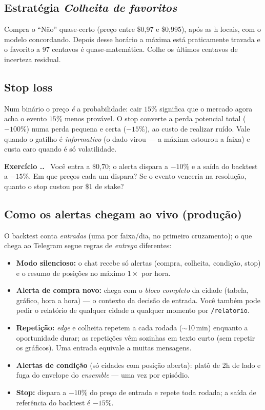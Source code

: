 \documentclass[11pt,a4paper]{article}
\newcounter{exc}[section]
\renewcommand{\theexc}{\thesection.\arabic{exc}}
\newenvironment{exercicio}{\refstepcounter{exc}\medskip\noindent
  \textbf{\color{azul}Exercício \theexc.}\ }{\medskip}
\begin{document}
\subsection{Estratégia \emph{Colheita de favoritos}}
Compra o ``Não'' quase-certo (preço entre \$0,97 e \$0,995), após as
\harvActiveHour{}h locais, com o modelo concordando. Depois desse horário a
máxima está praticamente travada e o favorito a 97 centavos é quase-matemática.
Colhe os últimos centavos de incerteza residual.

\subsection{Stop loss}
Num binário o preço \emph{é} a probabilidade: cair $15\%$ significa que o
mercado agora acha o evento $15\%$ menos provável. O stop converte a perda
potencial total ($-100\%$) numa perda pequena e certa ($-15\%$), ao custo de
realizar ruído. Vale quando o gatilho é \emph{informativo} (o dado virou --- a
máxima estourou a faixa) e custa caro quando é só volatilidade.

\begin{exercicio}
Você entra a \$0,70; o alerta dispara a $-10\%$ e a saída do backtest a
$-15\%$. Em que preços cada um dispara? Se o evento venceria na resolução,
quanto o stop custou por \$1 de stake?
\end{exercicio}

\subsection{Como os alertas chegam ao vivo (produção)}\label{sec:disparo-vivo}
O backtest conta \emph{entradas} (uma por faixa/dia, no primeiro cruzamento); o
que chega ao Telegram segue regras de \emph{entrega} diferentes:
\begin{itemize}
  \item \textbf{Modo silencioso:} o chat recebe só alertas (compra, colheita,
  condição, stop) e o resumo de posições no máximo $1\times$ por hora.
  \item \textbf{Alerta de compra novo:} chega com o \emph{bloco completo} da
  cidade (tabela, gráfico, hora a hora) --- o contexto da decisão de entrada.
  Você também pode pedir o relatório de qualquer cidade a qualquer momento por
  \texttt{/relatorio}.
  \item \textbf{Repetição:} \emph{edge} e colheita repetem a cada rodada
  ($\sim$10\,min) enquanto a oportunidade durar; as repetições vêm sozinhas em
  texto curto (sem repetir os gráficos). Uma entrada equivale a muitas
  mensagens.
  \item \textbf{Alertas de condição} (só cidades com posição aberta): platô de
  2h de lado e fuga do envelope do \emph{ensemble} --- uma vez por episódio.
  \item \textbf{Stop:} dispara a $-10\%$ do preço de entrada e repete toda
  rodada; a saída de referência do backtest é $-15\%$.
\end{itemize}
\end{document}
